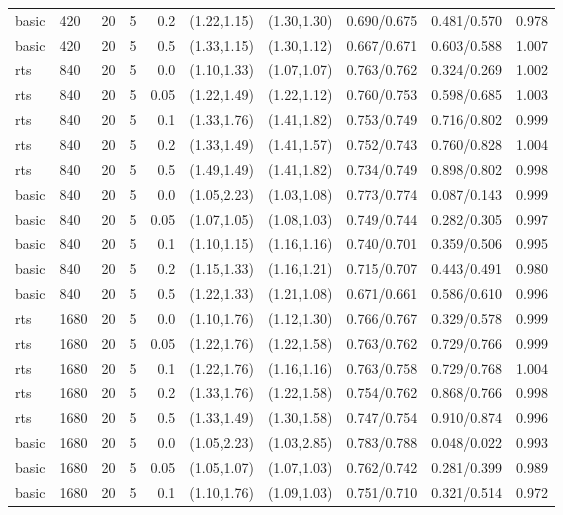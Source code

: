 \begin{tabular}{llrrrccccc}
basic & 420 & 20 & 5 & 0.2 & (1.22,1.15) & (1.30,1.30) & 0.690/0.675 & 0.481/0.570 & 0.978 \\
basic & 420 & 20 & 5 & 0.5 & (1.33,1.15) & (1.30,1.12) & 0.667/0.671 & 0.603/0.588 & 1.007 \\
rts & 840 & 20 & 5 & 0.0 & (1.10,1.33) & (1.07,1.07) & 0.763/0.762 & 0.324/0.269 & 1.002 \\
rts & 840 & 20 & 5 & 0.05 & (1.22,1.49) & (1.22,1.12) & 0.760/0.753 & 0.598/0.685 & 1.003 \\
rts & 840 & 20 & 5 & 0.1 & (1.33,1.76) & (1.41,1.82) & 0.753/0.749 & 0.716/0.802 & 0.999 \\
rts & 840 & 20 & 5 & 0.2 & (1.33,1.49) & (1.41,1.57) & 0.752/0.743 & 0.760/0.828 & 1.004 \\
rts & 840 & 20 & 5 & 0.5 & (1.49,1.49) & (1.41,1.82) & 0.734/0.749 & 0.898/0.802 & 0.998 \\
basic & 840 & 20 & 5 & 0.0 & (1.05,2.23) & (1.03,1.08) & 0.773/0.774 & 0.087/0.143 & 0.999 \\
basic & 840 & 20 & 5 & 0.05 & (1.07,1.05) & (1.08,1.03) & 0.749/0.744 & 0.282/0.305 & 0.997 \\
basic & 840 & 20 & 5 & 0.1 & (1.10,1.15) & (1.16,1.16) & 0.740/0.701 & 0.359/0.506 & 0.995 \\
basic & 840 & 20 & 5 & 0.2 & (1.15,1.33) & (1.16,1.21) & 0.715/0.707 & 0.443/0.491 & 0.980 \\
basic & 840 & 20 & 5 & 0.5 & (1.22,1.33) & (1.21,1.08) & 0.671/0.661 & 0.586/0.610 & 0.996 \\
rts & 1680 & 20 & 5 & 0.0 & (1.10,1.76) & (1.12,1.30) & 0.766/0.767 & 0.329/0.578 & 0.999 \\
rts & 1680 & 20 & 5 & 0.05 & (1.22,1.76) & (1.22,1.58) & 0.763/0.762 & 0.729/0.766 & 0.999 \\
rts & 1680 & 20 & 5 & 0.1 & (1.22,1.76) & (1.16,1.16) & 0.763/0.758 & 0.729/0.768 & 1.004 \\
rts & 1680 & 20 & 5 & 0.2 & (1.33,1.76) & (1.22,1.58) & 0.754/0.762 & 0.868/0.766 & 0.998 \\
rts & 1680 & 20 & 5 & 0.5 & (1.33,1.49) & (1.30,1.58) & 0.747/0.754 & 0.910/0.874 & 0.996 \\
basic & 1680 & 20 & 5 & 0.0 & (1.05,2.23) & (1.03,2.85) & 0.783/0.788 & 0.048/0.022 & 0.993 \\
basic & 1680 & 20 & 5 & 0.05 & (1.05,1.07) & (1.07,1.03) & 0.762/0.742 & 0.281/0.399 & 0.989 \\
basic & 1680 & 20 & 5 & 0.1 & (1.10,1.76) & (1.09,1.03) & 0.751/0.710 & 0.321/0.514 & 0.972 \\

\end{tabular}
